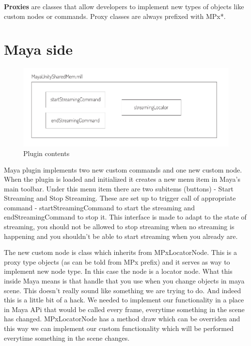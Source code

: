 \documentclass[
  digital, %
  table,   %
  nolof,     %
  nolot,     %
]{fithesis3}
\begin{document}
\textbf{Proxies} are classes that allow developers to implement new types of objects like custom nodes or commands. Proxy classes are always prefixed with MPx*.

\section{Maya side}
\begin{figure}
  \centering
  \includegraphics[scale=0.8]{images/plugin-contents.pdf}
  \caption{Plugin contents}
  \label{fig:plugin-content}
\end{figure}
Maya plugin implements two new custom commands and one new custom node. When the plugin is loaded and initialized it creates a new menu item in Maya's main toolbar. Under this menu item there are two subitems (buttons) - Start Streaming and Stop Streaming. These are set up to trigger call of appropriate command - startStreamingCommand to start the streaming and endStreamingCommand to stop it. This interface is made to adapt to the state of streaming, you should not be allowed to stop streaming when no streaming is happening and you shouldn't be able to start streaming when you already are.

The new custom node is class which inherits from MPxLocatorNode. This is a proxy type objects (as can be told from MPx prefix) and it serves as way to implement new node type. In this case the node is a locator node. What this inside Maya means is that handle that you use when you change objects in maya scene. This doesn't really sound like something we are trying to do. And indeed this is a little bit of a hack. We needed to implement our functionality in a place in Maya APi that would be called every frame, everytime something in the scene has changed. MPxLocatorNode has a method draw which can be overriden and this way we can implement our custom functionality which will be performed everytime something in the scene changes.
\end{document}
